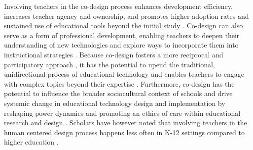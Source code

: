 Involving teachers in the co-design process enhances development efficiency, increases teacher agency and ownership, and promotes higher adoption rates and sustained use of educational tools beyond the initial study \cite{penuel2007designing, bakah2012updating, wan2021exploratory, handelzalts2019collaborative, mckenney2016collaborative, lin2021engaging}. %
Co-design can also serve as a form of professional development, enabling teachers to deepen their understanding of new technologies and explore ways to incorporate them into instructional strategies \cite{wan2021exploratory, bakah2012updating, voogt2015collaborative}. Because co-design fosters a more reciprocal and participatory approach {\cite{alfredo2024human}}, it has the potential to upend the traditional, unidirectional process of educational technology  \cite{teeters2016challenge} and enables teachers to engage with complex topics beyond their expertise \cite{disalvo2017participatory}. %
Furthermore, co-design has the potential to influence the broader sociocultural context of schools and drive systemic change in educational technology design and implementation by reshaping power dynamics and promoting an ethics of care within educational research and design \cite{wake2013developing, higgins2019power, matuk2021students}. {Scholars have however noted that involving teachers in the human centered design process happens less often in K-12 settings compared to higher education \cite{topali2024designing}.}



